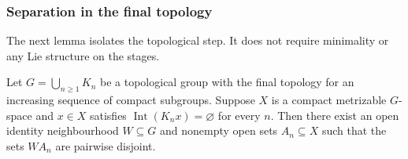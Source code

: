 \subsubsection{Separation in the final topology}

The next lemma isolates the topological step. It does not require
minimality or any Lie structure on the stages.

\begin{lemma}\label{lem:ind-final-open-separation}
Let $G=\bigcup_{n\ge1}K_n$ be a topological group with the final
topology for an increasing sequence of compact subgroups. Suppose
$X$ is a compact metrizable $G$-space and $x\in X$ satisfies
$\operatorname{Int}(K_nx)=\varnothing$ for every $n$. Then there
exist an open identity neighbourhood $W\subseteq G$ and nonempty open
sets $A_n\subseteq X$ such that the sets $WA_n$ are pairwise disjoint.
\end{lemma}

